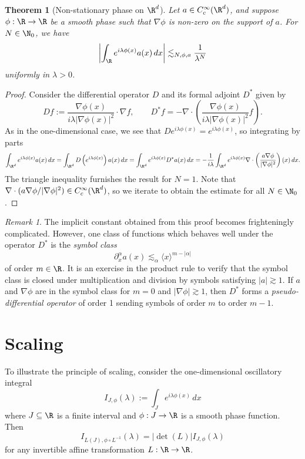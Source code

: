 \documentclass[reqno]{amsart}
\newtheorem{theorem}{Theorem}
\theoremstyle{definition}
\theoremstyle{remark}
\newtheorem*{remark}{Remark}
\begin{document}
\begin{theorem}[Non-stationary phase on $\R^d$]
	Let $a \in C^\infty_c (\R^d)$, and suppose $\phi : \R \to \R$ be a smooth phase such that $\nabla \phi$ is non-zero on the support of $a$. For $N \in \N_0$, we have 
		\[ \left| \int_\R e^{i \lambda \phi(x)} a(x) \, dx \right| \lesssim_{N, \phi, a} \frac{1}{\lambda^N} \]
	uniformly in $\lambda > 0$. 	
\end{theorem}

\begin{proof}
	Consider the differential operator $D$ and its formal adjoint $D^*$ given by 
		\[ D f := \frac{\nabla \phi (x)}{i \lambda |\nabla \phi(x)|^2} \cdot \nabla f, \qquad D^* f = - \nabla \cdot \left( \frac{\nabla \phi(x)}{i \lambda |\nabla \phi(x)|^2} f \right). \]
	As in the one-dimensional case, we see that $D e^{i \lambda \phi(x)} = e^{i \lambda \phi(x)}$, so integrating by parts
		\[ \int_{\R^d} e^{i \lambda \phi(x)} a(x) \, dx = \int_{\R^d} D \left( e^{i \lambda \phi(x)} \right) a(x) \, dx = \int_{\R^d} e^{i \lambda \phi(x)} D^* a(x) \, dx = - \frac{1}{i\lambda} \int_{\R^d} e^{i \lambda \phi(x)} \nabla \cdot \left( \frac{a \nabla \phi }{|\nabla \phi|^2} \right)(x) \, dx  .\]
	The triangle inequality furnishes the result for $N = 1$. Note that $\nabla \cdot (a\nabla \phi /|\nabla \phi|^2) \in C^\infty_c (\R^d)$, so we iterate to obtain the estimate for all $N \in \N_0$. 
\end{proof}

\begin{remark}
	The implicit constant obtained from this proof becomes frighteningly complicated. However, one class of functions which behaves well under the operator $D^*$ is the \textit{symbol class}
		\[ \partial^\alpha_x a(x) \lesssim_\alpha \langle x \rangle^{m - |\alpha|} \]
	of order $m \in \R$. It is an exercise in the product rule to verify that the symbol class is closed under multiplication and division by symbols satisfying $|a| \gtrsim 1$. If $a$ and $\nabla \phi$ are in the symbol class for $m = 0$ and $|\nabla \phi| \gtrsim 1$, then $D^*$ forms a \textit{pseudo-differential operator} of order 1 sending symbols of order $m$ to order $m - 1$. 
\end{remark}


\section{Scaling}

To illustrate the principle of scaling, consider the one-dimensional oscillatory integral
	\[ I_{J, \phi} (\lambda) := \int_J e^{i \lambda \phi(x)} \, dx \]
where $J \subseteq \R$ is a finite interval and $\phi : J \to \R$ is a smooth phase function. Then 
	\[ I_{L(J), \phi \circ L^{-1}} (\lambda) = |\det (L)| I_{J, \phi} (\lambda) \]
for any invertible affine transformation $L : \R \to \R$.
\end{document}
